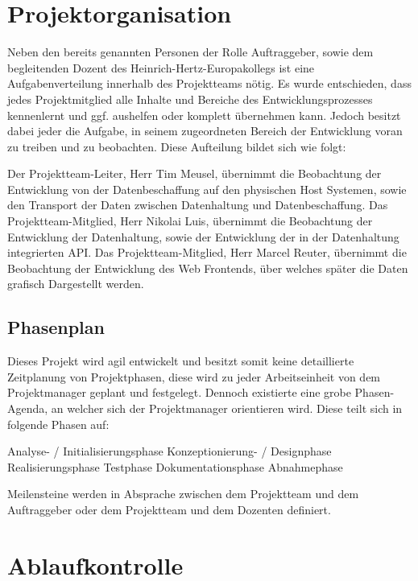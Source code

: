 \section{Projektorganisation}

Neben den bereits genannten Personen der Rolle Auftraggeber, sowie dem
begleitenden Dozent des Heinrich-Hertz-Europakollegs ist eine
Aufgabenverteilung innerhalb des Projektteams nötig. Es wurde entschieden, dass
jedes Projektmitglied alle Inhalte und Bereiche des Entwicklungsprozesses
kennenlernt und ggf. aushelfen oder komplett übernehmen kann. Jedoch besitzt
dabei jeder die Aufgabe, in seinem zugeordneten Bereich der Entwicklung voran
zu treiben und zu beobachten. Diese Aufteilung bildet sich wie folgt:
\begin{outline}
  \1 Der Projektteam-Leiter, Herr Tim Meusel, übernimmt die Beobachtung der
    \2 Entwicklung von der Datenbeschaffung auf den physischen Host Systemen,
    \2 sowie den Transport der Daten zwischen Datenhaltung und Datenbeschaffung.
  \1 Das Projektteam-Mitglied, Herr Nikolai Luis, übernimmt die Beobachtung der
    \2 Entwicklung der Datenhaltung,
    \2 sowie der Entwicklung der in der Datenhaltung integrierten API.
  \1 Das Projektteam-Mitglied, Herr Marcel Reuter, übernimmt die Beobachtung der
    \2 Entwicklung des Web Frontends, über welches später die Daten grafisch
    Dargestellt werden.
\end{outline}

\subsection{Phasenplan}

Dieses Projekt wird agil entwickelt und besitzt somit keine detaillierte
Zeitplanung von Projektphasen, diese wird zu jeder Arbeitseinheit von dem
Projektmanager geplant und festgelegt. Dennoch existierte eine grobe
Phasen-Agenda, an welcher sich der Projektmanager orientieren wird. Diese
teilt sich in folgende Phasen auf:
\begin{outline}
  \1 Analyse- / Initialisierungsphase
  \1 Konzeptionierung- / Designphase
  \1 Realisierungsphase
  \1 Testphase
  \1 Dokumentationsphase
  \1 Abnahmephase
\end{outline}

Meilensteine werden in Absprache zwischen dem Projektteam und dem Auftraggeber
oder dem Projektteam und dem Dozenten definiert.


\section{Ablaufkontrolle}


